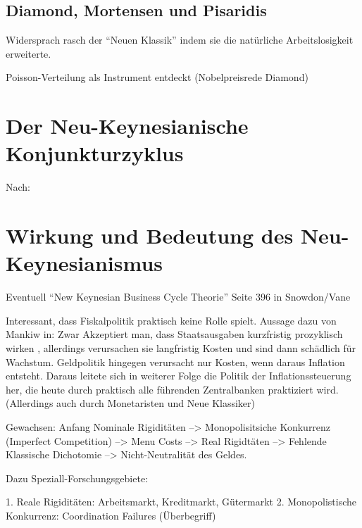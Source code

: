\subsection{Diamond, Mortensen und Pisaridis}

Widersprach rasch der "`Neuen Klassik"' indem sie die natürliche Arbeitslosigkeit erweiterte.

Poisson-Verteilung als Instrument entdeckt (Nobelpreisrede Diamond)



\section{Der Neu-Keynesianische Konjunkturzyklus}

Nach:
\textcite{Yellen1984}
\textcite[S. 396]{Snowdon2005}



\section{Wirkung und Bedeutung des Neu-Keynesianismus}
Eventuell "`New Keynesian Business Cycle Theorie"' Seite 396 in Snowdon/Vane

Interessant, dass Fiskalpolitik praktisch keine Rolle spielt. Aussage dazu von Mankiw in: \parencite[S. 446]{Snowdon2005} Zwar Akzeptiert man, dass Staatsausgaben kurzfristig prozyklisch wirken \parencite[S. 408]{Snowdon2005}, allerdings verursachen sie langfristig Kosten und sind dann schädlich für Wachstum. Geldpolitik hingegen verursacht nur Kosten, wenn daraus Inflation entsteht. Daraus leitete sich in weiterer Folge \parencite[S. 413]{Snowdon2005} die Politik der Inflationssteuerung her, die heute durch praktisch alle führenden Zentralbanken praktiziert wird. (Allerdings auch durch Monetaristen und Neue Klassiker)

Gewachsen: Anfang Nominale Rigiditäten --> Monopolisitsiche Konkurrenz (Imperfect Competition) --> Menu Costs --> Real Rigidtäten --> Fehlende Klassische Dichotomie --> Nicht-Neutralität des Geldes.

Dazu Speziall-Forschungsgebiete: 

1. Reale Rigiditäten: Arbeitsmarkt, Kreditmarkt, Gütermarkt
2. Monopolistische Konkurrenz: Coordination Failures (Überbegriff)
